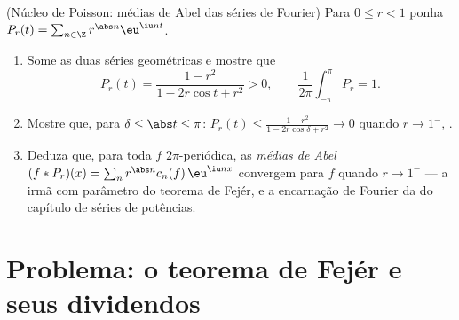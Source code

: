 \begin{exercise}[$\star\star\star$]\label{exo:b2:fourier:12}
(Núcleo de Poisson: médias de Abel das séries de Fourier) Para $0 \leq r <
1$ ponha $P_r(t) = \sum_{n\in\Z} r^{\abs n}\eu^{\iu nt}$.
\begin{enumerate}
  \item Some as duas séries geométricas e mostre que
        \[
        P_r(t) = \frac{1 - r^2}{1 - 2r\cos t + r^2} > 0,
        \qquad
        \frac{1}{2\pi}\int_{-\pi}^{\pi}P_r = 1 .
        \]
  \item Mostre que, para $\delta \leq \abs t \leq \pi$: $P_r(t)
        \leq \frac{1 - r^2}{1 - 2r\cos\delta + r^2} \to 0$ quando
        $r \to 1^-$, .
  \item Deduza que, para toda $f$  $2\pi$-periódica,
        as \emph{médias de Abel} $(f * P_r)(x) = \sum_n
        r^{\abs n}c_n(f)\,\eu^{\iu nx}$ convergem para $f$
         quando $r \to 1^-$ --- a irmã com parâmetro 
        do teorema de Fejér, e a encarnação de Fourier
        da  do capítulo de séries de
        potências.
\end{enumerate}
\end{exercise}

\section{Problema: o teorema de Fejér e seus dividendos}

